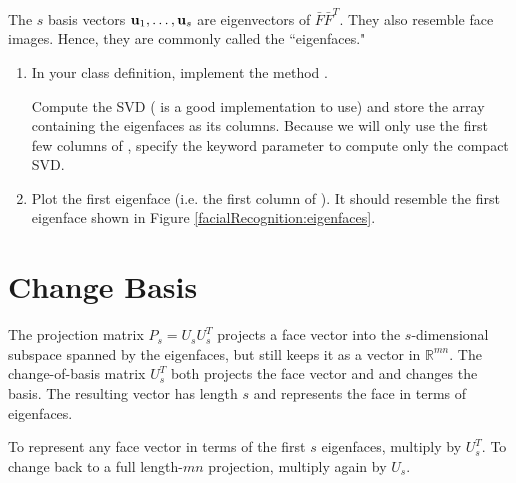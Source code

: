 The $s$ basis vectors $\mathbf{u}_1, \ldots, \mathbf{u}_s$ are eigenvectors of $\bar{F}\bar{F}^T$.
They also resemble face images.
Hence, they are commonly called the ``eigenfaces."

\begin{problem}
\label{prob:svd}
\leavevmode
\begin{enumerate}
\item In your class definition, implement the method .

Compute the SVD ( is a good implementation to use) and store the array  containing the eigenfaces as its columns.
Because we will only use the first few columns of , specify the keyword parameter  to compute only the compact SVD.
\item Plot the first eigenface (i.e. the first column of ).
It should resemble the first eigenface shown in Figure \ref{facialRecognition:eigenfaces}.
\end{enumerate}
\end{problem}

\section*{Change Basis} %

The projection matrix $P_s = U_s U_s^T$ projects a face vector into the $s$-dimensional subspace spanned by the eigenfaces, but still keeps it as a vector in $\mathbb{R}^{mn}$.
The change-of-basis matrix $U_s^T$ both projects the face vector and and changes the basis.
The resulting vector has length $s$ and represents the face in terms of eigenfaces.

To represent any face vector in terms of the first $s$ eigenfaces, multiply by $U_s^T$.
To change back to a full length-$mn$ projection, multiply again by $U_s$.

